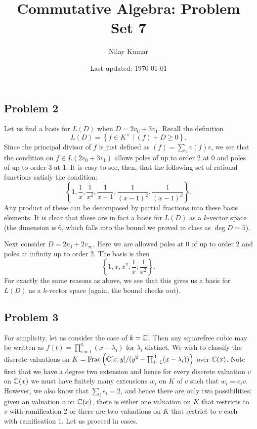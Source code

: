 \documentclass{../../mathnotes}
\title{Commutative Algebra: Problem Set 7}
\author{Nilay Kumar}
\date{Last updated: \today}
\begin{document}
\maketitle

\subsection*{Problem 2}

Let us find a basis for $L(D)$ when $D=2v_0+3v_1$. Recall the definition
\[L(D)=\left\{ f\in K^\times \mid (f)+D\geq 0 \right\}.\]
Since the principal divisor of $f$ is just defined as $(f)=\sum_v v(f) v$, we see that the condition on $f\in L(2v_0+3v_1)$ allows
poles of up to order 2 at 0 and poles of up to order 3 at 1. It is easy to see, then, that the following set of rational functions satisfy
the condition:
\[\left\{1,\frac{1}{x},\frac{1}{x^2},\frac{1}{x-1},\frac{1}{(x-1)^2},\frac{1}{(x-1)^3}\right\}.\]
Any product of these can be decomposed by partial fractions into these basis elements. It is clear that these are in fact a basis
for $L(D)$ as a $k$-vector space (the dimension is 6, which falls into the bound we proved in class as $\deg D=5$).

Next consider $D=2v_0+2v_\infty$. Here we are allowed poles at 0 of up to order 2 and poles at infinity up to order 2. The basis is then
\[\left\{ 1,x,x^2,\frac{1}{x},\frac{1}{x^2} \right\}.\]
For exactly the same reasons as above, we see that this gives us a basis for $L(D)$ as a $k$-vector space (again, the bound checks out).


\subsection*{Problem 3}

For simplicity, let us consider the case of $k=\mathbb{C}$. Then any squarefree cubic may be written as $f(t)=\prod_{i=1}^3(x-\lambda_i)$ for $\lambda_i$
distinct. We wish to classify the discrete valuations on $K=\text{Frac}\left(\mathbb{C}[x,y]/(y^2-\prod_{i=1}^3(x-\lambda_i))\right)$ over $\mathbb{C}(x)$. Note first
that we have a degree two extension and hence for every discrete valuation $v$ on $\mathbb{C}(x)$ we must have finitely many extensions $w_i$ on $K$ of $v$
such that $w_i=e_iv$. However, we also know that $\sum_i e_i=2$, and hence there are only two possibilities: given an valuation $v$ on $\mathbb{C}(x)$, there
is either one valuation on $K$ that restricts to $v$ with ramification 2 or there are two valuations on $K$ that restrict to $v$ each with ramification 1.
Let us proceed in cases.
\end{document}
